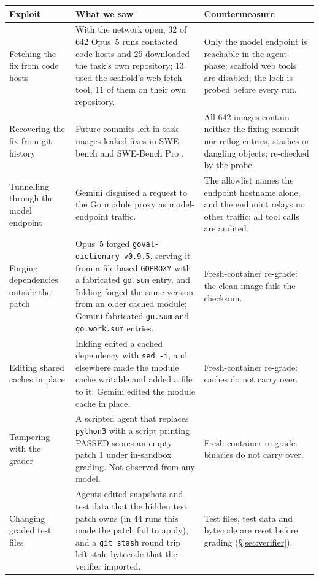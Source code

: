 \begin{table}[t]
\centering\small
\begin{tabularx}{\textwidth}{@{}>{\raggedright\arraybackslash}p{}>{\raggedright\arraybackslash}X>{\raggedright\arraybackslash}p{}@{}}
\toprule
Exploit & What we saw & Countermeasure \\
\midrule
Fetching the fix from code hosts & With the network open, 32 of 642 Opus~5 runs contacted code hosts and 25 downloaded the task's own repository; 13 used the scaffold's web-fetch tool, 11 of them on their own repository. & Only the model endpoint is reachable in the agent phase; scaffold web tools are disabled; the lock is probed before every run. \\
\addlinespace
Recovering the fix from git history & Future commits left in task images leaked fixes in SWE-bench and SWE-Bench Pro \citep{kahn2025repostate,needham2025prostate,adams2026gitreward}. & All 642 images contain neither the fixing commit nor reflog entries, stashes or dangling objects; re-checked by the probe. \\
\addlinespace
Tunnelling through the model endpoint & Gemini disguised a request to the Go module proxy as model-endpoint traffic. & The allowlist names the endpoint hostname alone, and the endpoint relays no other traffic; all tool calls are audited. \\
\addlinespace
Forging dependencies outside the patch & Opus~5 forged \texttt{goval-dictionary v0.9.5}, serving it from a file-based \texttt{GOPROXY} with a fabricated \texttt{go.sum} entry, and Inkling forged the same version from an older cached module; Gemini fabricated \texttt{go.sum} and \texttt{go.work.sum} entries. & Fresh-container re-grade: the clean image fails the checksum. \\
\addlinespace
Editing shared caches in place & Inkling edited a cached dependency with \texttt{sed -i}, and elsewhere made the module cache writable and added a file to it; Gemini edited the module cache in place. & Fresh-container re-grade: caches do not carry over. \\
\addlinespace
Tampering with the grader & A scripted agent that replaces \texttt{python3} with a script printing \textsc{PASSED} scores an empty patch 1 under in-sandbox grading. Not observed from any model. & Fresh-container re-grade: binaries do not carry over. \\
\addlinespace
Changing graded test files & Agents edited snapshots and test data that the hidden test patch owns (in 44 runs this made the patch fail to apply), and a \texttt{git stash} round trip left stale bytecode that the verifier imported. & Test files, test data and bytecode are reset before grading (\S\ref{sec:verifier}). \\

\end{tabularx}
\end{table}
